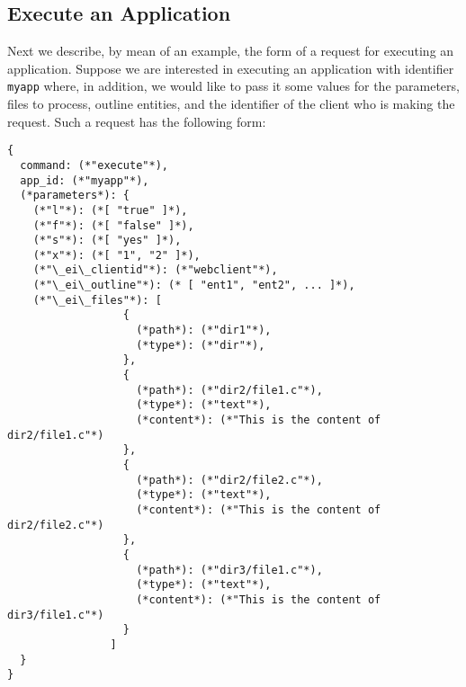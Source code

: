 \subsection{Execute an Application}

Next we describe, by mean of an example, the form of a request for
executing an application. Suppose we are interested in executing an
application with identifier \texttt{myapp} where, in addition, we
would like to pass it some values for the parameters, files to
process, outline entities, and the identifier of the client who is
making the request. Such a request has the following form:

\bigskip
\begin{lstlisting}
{
  command: (*"execute"*),
  app_id: (*"myapp"*),
  (*parameters*): {
    (*"l"*): (*[ "true" ]*),
    (*"f"*): (*[ "false" ]*),
    (*"s"*): (*[ "yes" ]*),
    (*"x"*): (*[ "1", "2" ]*), 
    (*"\_ei\_clientid"*): (*"webclient"*),
    (*"\_ei\_outline"*): (* [ "ent1", "ent2", ... ]*),
    (*"\_ei\_files"*): [
                  {
                    (*path*): (*"dir1"*),
                    (*type*): (*"dir"*),
                  },
                  {
                    (*path*): (*"dir2/file1.c"*),
                    (*type*): (*"text"*),
                    (*content*): (*"This is the content of dir2/file1.c"*)
                  },
                  {
                    (*path*): (*"dir2/file2.c"*),
                    (*type*): (*"text"*),
                    (*content*): (*"This is the content of dir2/file2.c"*)
                  },
                  {
                    (*path*): (*"dir3/file1.c"*),
                    (*type*): (*"text"*),
                    (*content*): (*"This is the content of dir3/file1.c"*)
                  }
                ]
  }
}
\end{lstlisting}

